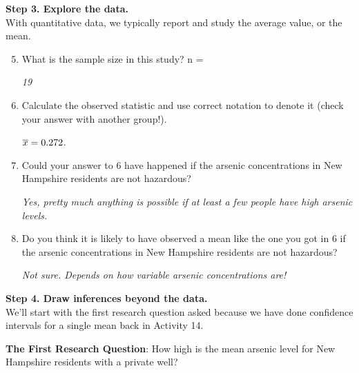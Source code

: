 {\bf Step 3. Explore the data. }\\
With quantitative data, we typically report and study the average value, or the mean.
\begin{enumerate}
\setcounter{enumi}{4}
\item  What is the sample size in this study?  n = \begin{key}
  {\it 19}
\end{key}

\item \label{xbar} Calculate the observed statistic and use correct notation to
  denote it (check your answer with another  group!).
\begin{students}
  \vspace{1cm}
\end{students}
\begin{key}
   $ \overline{x} =   0.272$. 
\end{key}
\item  Could your answer to 6 have happened if the arsenic
  concentrations in New Hampshire residents are not hazardous? 
\begin{students}
  \vspace{1cm}
\end{students}
\begin{key}
   {\it Yes, pretty much anything is possible if at least a few people
     have high arsenic levels.}  
\end{key}
\item  Do you think it is likely to have observed a mean like the one
  you got in 6 if the arsenic concentrations in New Hampshire
  residents are not hazardous?
  
\begin{students}
  \vspace{1cm}
\end{students}
\begin{key}
   {\it Not sure.  Depends on how variable arsenic concentrations are!
}
\end{key}
\end{enumerate}


{\bf Step 4. Draw inferences beyond the data. }\\
We'll start with the first research question asked because we have
done confidence intervals for a single mean back in Activity 14. 

{\bf The First Research Question}: How high is the mean arsenic level
for New Hampshire residents with a private well? 

